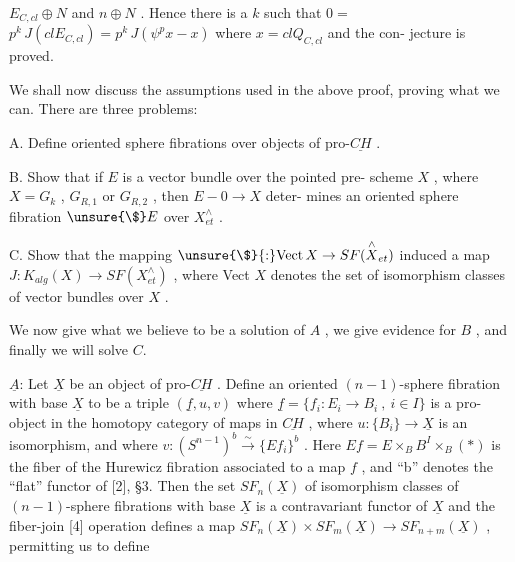 
$E_{C,cl} \oplus N$ and $n \oplus N$ . Hence there is a $k$ such that $0 =$
$p^{k}\, J(clE_{C,cl}) = p^{k}\, J(\psi^{p}x - x)$ where $x = clQ_{C,cl}$ and the con-%
jecture is proved.

We shall now discuss the assumptions used in the above proof,
proving what we can. There are three problems:

A. Define oriented sphere fibrations over objects of pro-$\underline{CH}$ .

B. Show that if $E$ is a vector bundle over the pointed pre-%
scheme $X$ , where $X = G_{k}$ , $G_{R,1}$ or $G_{R,2}$ , then $E - 0 \to X$ deter-%
mines an oriented sphere fibration $\unsure{\$}E$ over $X^{\wedge}_{et}$ .

C. Show that the mapping $\unsure{\$}{:}\mathrm{Vect}\,X \to SF(\overset{\wedge}{X}_{et})$ induced a map
$J{:}K_{alg}(X) \to SF(X^{\wedge}_{et})$ , where Vect $X$ denotes the set of isomorphism
classes of vector bundles over $X$ .

We now give what we believe to be a solution of $A$ , we give
evidence for $B$ , and finally we will solve $C$.

$\underline{A}$: Let $\underline{X}$ be an object of pro-$\underline{CH}$ . Define an oriented
$(n - 1)$-sphere fibration with base $\underline{X}$ to be a triple $(\underline{f},u,v)$
where $\underline{f} = \{f_{i}{:}E_{i} \to B_{i}\ ,\ i \in I\}$ is a pro-object in the homotopy
category of maps in $\underline{CH}$ , where $u{:}\{B_{i}\} \to \underline{X}$ is an isomorphism,
and where $v{:}(S^{n-1})^{b} \xrightarrow{\sim} \{Ef_{i}\}^{b}$ . Here $Ef = E\times_{B}B^{I}\times_{B}(*)$ is the
fiber of the Hurewicz fibration associated to a map $f$ , and ``b''
denotes the ``flat'' functor of [2], §3. Then the set $SF_{n}(\underline{X})$ of
isomorphism classes of $(n - 1)$-sphere fibrations with base $\underline{X}$
is a contravariant functor of $\underline{X}$ and the fiber-join [4] operation
defines a map $SF_{n}(\underline{X})\times SF_{m}(\underline{X}) \to SF_{n+m}(\underline{X})$ , permitting us to define

